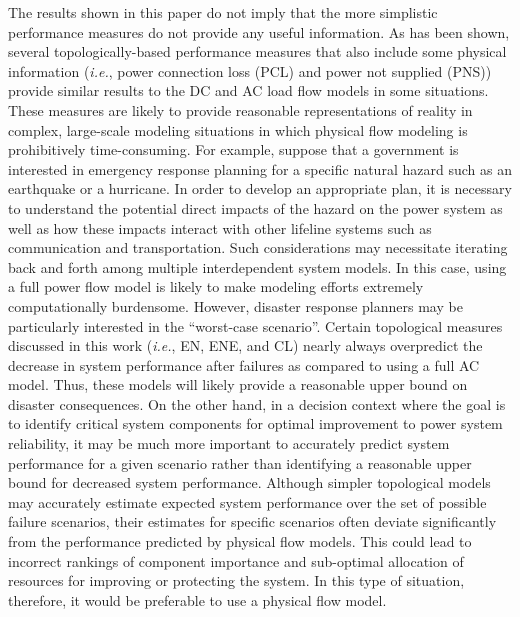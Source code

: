 The results shown in this paper do not imply that the more simplistic performance measures do not provide any useful information. As has been shown, several topologically-based performance measures that also include some physical information (\emph{i.e.}, power connection loss (PCL) and power not supplied (PNS)) provide similar results to the DC and AC load flow models in some situations. These measures are likely to provide reasonable representations of reality in complex, large-scale modeling situations in which physical flow modeling is prohibitively time-consuming. For example, suppose that a government is interested in emergency response planning for a specific natural hazard such as an earthquake or a hurricane.  In order to develop an appropriate plan, it is necessary to understand the potential direct impacts of the hazard on the power system as well as how these impacts interact with other lifeline systems such as communication and transportation.  Such considerations may necessitate iterating back and forth among multiple interdependent system models.  In this case, using a full power flow model is likely to make modeling efforts extremely computationally burdensome.  However, disaster response planners may be particularly interested in the ``worst-case scenario''. Certain topological measures discussed in this work (\emph{i.e.}, EN, ENE, and CL) nearly always overpredict the decrease in system performance after failures as compared to using a full AC model. Thus, these models will likely provide a reasonable upper bound on disaster consequences.  On the other hand, in a decision context where the goal is to identify critical system components for optimal improvement to power system reliability, it may be much more important to accurately predict system performance for a given scenario rather than identifying a reasonable upper bound for decreased system performance.  Although simpler topological models may accurately estimate expected system performance over the set of possible failure scenarios, their estimates for specific scenarios often deviate significantly from the performance predicted by physical flow models.  This could lead to incorrect rankings of component importance and sub-optimal allocation of resources for improving or protecting the system.  In this type of situation, therefore, it would be preferable to use a physical flow model.

